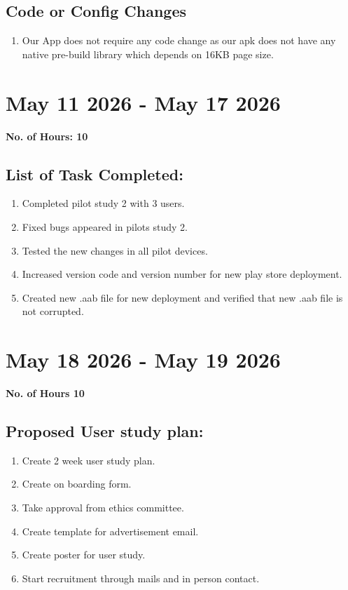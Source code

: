 \documentclass[12pt]{article}
\begin{document}
\subsection{Code or Config Changes}
\begin{enumerate}
    \item Our App does not require any code change as our apk does not have any native pre-build library which depends on 16KB page size.
\end{enumerate}
\section{May 11 2026  - May 17 2026}
{\bf No. of Hours: 10}
\subsection{List of Task Completed:}
\begin{enumerate}
    \item Completed pilot study 2 with 3 users.
    \item Fixed bugs appeared in pilots study 2.
    \item Tested the new changes in all pilot devices.
    \item Increased version code and version number for new play store deployment.
    \item Created new .aab file for new deployment and verified that new .aab file is not corrupted.
\end{enumerate}
\section{May 18 2026 - May 19 2026}
{\bf No. of Hours 10}

\subsection{Proposed User study plan: }
\begin{enumerate}
    \item Create 2 week user study plan.
    \item Create on boarding form.
    \item Take approval from ethics committee.
    \item Create template for advertisement email.
    \item Create poster for user study.
    \item Start recruitment through mails and in person contact.
\end{enumerate}
\end{document}
